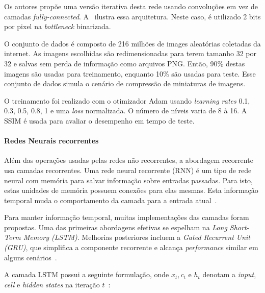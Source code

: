 Os autores propõe uma versão iterativa desta rede usando convoluções em vez de camadas \textit{fully-connected}. A~ ilustra essa arquitetura. Neste caso, é utilizado 2 bits por pixel na \textit{bottleneck} binarizada.


O conjunto de dados é composto de 216 milhões de images aleatórias coletadas da internet. As imagens escolhidas são redimensionadas para terem tamanho 32 por 32 e salvas sem perda de informação como arquivos \acrshort{PNG}. Então, 90\% destas imagens são usadas para treinamento, enquanto 10\% são usadas para teste. Esse conjunto de dados simula o cenário de compressão de miniaturas de imagens.

O treinamento foi realizado com o otimizador Adam usando \textit{learning rates} {0.1, 0.3, 0.5, 0.8, 1} e uma \textit{loss} normalizada. O número de níveis varia de 8 à 16. A \acrshort{SSIM} é usada para avaliar o desempenho em tempo de teste. 

\paragraph{Redes Neurais recorrentes\\}
Além das operações usadas pelas redes não recorrentes, a abordagem recorrente usa camadas recorrentes. Uma rede neural recorrente (\acrshort{RNN}) é um tipo de rede neural com memória para salvar informação sobre entradas passadas. Para isto, estas unidades de memória possuem conexões para elas mesmas. Esta informação temporal muda o comportamento da camada para a entrada atual~\cite{Survey_CSVT2019}.

Para manter informação temporal, muitas implementações das camadas foram propostas. Uma das primeiras abordagens efetivas se espelham na \textit{Long Short-Term Memory (\acrshort{LSTM})}. Melhorias posteriores incluem a \textit{Gated Recurrent Unit (\acrshort{GRU})}, que simplifica a componente recorrente e alcança \textit{performance} similar em alguns cenários~\cite{Survey_CSVT2019}. 

A camada \acrshort{LSTM} possui a seguinte formulação, onde $x_t, c_t \textrm{ e } h_t$ denotam a \textit{input}, \textit{cell} e \textit{hidden states} na iteração $t$~\cite{FullResolution2017Toderici}:


